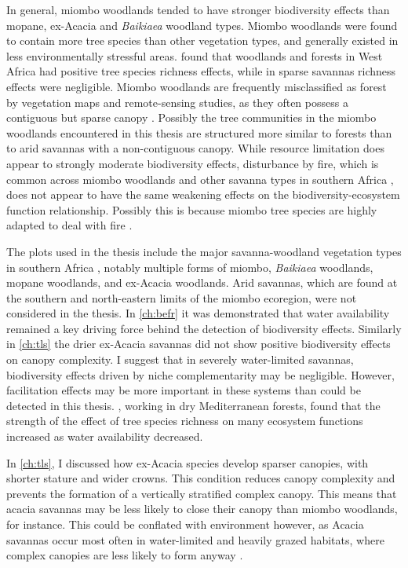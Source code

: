 \begin{refsection}
In general, miombo woodlands tended to have stronger biodiversity effects than mopane, ex-Acacia and \textit{Baikiaea} woodland types. Miombo woodlands were found to contain more tree species than other vegetation types, and generally existed in less environmentally stressful areas. \citet{Mensah2020} found that woodlands and forests in West Africa had positive tree species richness effects, while in sparse savannas richness effects were negligible. Miombo woodlands are frequently misclassified as forest by vegetation maps and remote-sensing studies, as they often possess a contiguous but sparse canopy \citep{Solbrig1996}. Possibly the tree communities in the miombo woodlands encountered in this thesis are structured more similar to forests than to arid savannas with a non-contiguous canopy. While resource limitation does appear to strongly moderate biodiversity effects, disturbance by fire, which is common across miombo woodlands and other savanna types in southern Africa \citep{Saito2014}, does not appear to have the same weakening effects on the biodiversity-ecosystem function relationship. Possibly this is because miombo tree species are highly adapted to deal with fire \citep{Dantas2013}. 

The plots used in the thesis include the major savanna-woodland vegetation types in southern Africa \citep{White1983}, notably multiple forms of miombo, \textit{Baikiaea} woodlands, mopane woodlands, and ex-Acacia woodlands. Arid savannas, which are found at the southern and north-eastern limits of the miombo ecoregion, were not considered in the thesis. In \autoref{ch:befr} it was demonstrated that water availability remained a key driving force behind the detection of biodiversity effects. Similarly in \autoref{ch:tls} the drier ex-Acacia savannas did not show positive biodiversity effects on canopy complexity. I suggest that in severely water-limited savannas, biodiversity effects driven by niche complementarity may be negligible. However, facilitation effects may be more important in these systems than could be detected in this thesis. \citet{Ratcliffe2017}, working in dry Mediterranean forests, found that the strength of the effect of tree species richness on many ecosystem functions increased as water availability decreased. 

In \autoref{ch:tls}, I discussed how ex-Acacia species develop sparser canopies, with shorter stature and wider crowns. This condition reduces canopy complexity and prevents the formation of a vertically stratified complex canopy. This means that acacia savannas may be less likely to close their canopy than miombo woodlands, for instance. This could be conflated with environment however, as Acacia savannas occur most often in water-limited and heavily grazed habitats, where complex canopies are less likely to form anyway \citep{Archibald2003}.


\end{refsection}
